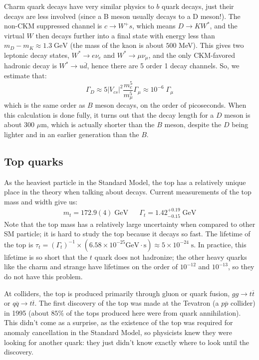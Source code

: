 \documentclass[11pt, oneside]{article}   	%
\theoremstyle{definition}
\numberwithin{equation}{subsection}		%
\begin{document}
Charm quark decays have very similar physics to $b$ quark decays, just their decays are less involved (since a B meson usually 
decays to a D meson!). The non-CKM suppressed channel is $c\rightarrow W^+ s$, which means $D\rightarrow K W^*$, and 
the virtual $W$ then decays further into a final state with energy less than $m_D - m_K \approx 1.3\;\mathrm{GeV}$ (the mass of the 
kaon is about $500$ MeV). This gives two leptonic decay states, $W^*\rightarrow e\nu_e$ and $W^*\rightarrow \mu\nu_\mu$, and 
the only CKM-favored hadronic decay is $W^*\rightarrow u\overline d$, hence there are 5 order 1 decay channels. So, we estimate that:
\begin{equation}
	\Gamma_D\approx 5 |V_{cs}|^2 \frac{m_c^5}{m_\mu^5} \Gamma_\mu\approx 10^{-6}\;\Gamma_\mu
\end{equation}
which is the same order as $B$ meson decays, on the order of picoseconds. When this calculation is done fully, it turns out that 
the decay length for a $D$ meson is about 300 $\mu$m, which is actually shorter than the $B$ meson, despite the $D$ being 
lighter and in an earlier generation than the $B$.

\subsection{Top quarks}

As the heaviest particle in the Standard Model, the top has a relatively unique place in the theory when talking about decays. Current 
measurements of the top mass and width give us:
\begin{align}
	m_t = 172.9(4) \;\mathrm{GeV} && \Gamma_t = 1.42^{+0.19}_{-0.15} \;\mathrm{GeV}
\end{align}
Note that the top mass has a relatively large uncertainty when compared to other SM particle; it is hard to study the top because it decays so 
fast. The lifetime of the top is $\tau_t = (\Gamma_t)^{-1} \times (6.58\times 10^{-25} \mathrm{GeV}\cdot\mathrm{s})\approx 5\times 
10^{-24} \;\mathrm{s}$. In practice, this lifetime is so short that the $t$ quark does not hadronize; the other heavy quarks like the charm and 
strange have lifetimes on the order of $10^{-12}$ and $10^{-13}$, so they do not have this problem.

At colliders, the top is produced primarily through gluon or quark fusion, $gg\rightarrow t\overline t$ or $q\overline q\rightarrow t\overline t$. 
The first discovery of the top was made at the Tevatron (a $p\overline p$ collider) in 1995 (about $85\%$ of the tops produced here were 
from quark annihilation). This didn't come as a surprise, as the existence of the top was required for anomaly cancellation in the Standard 
Model, so physicists knew they were looking for another quark: they just didn't know exactly where to look until the discovery. 
\end{document}
